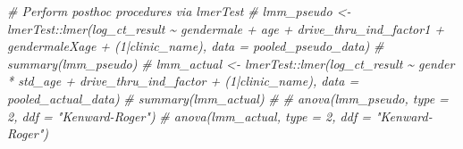 \documentclass[
]{article}
\newenvironment{Shaded}{\begin{snugshade}}{\end{snugshade}}
\newcommand{\CommentTok}[1]{\textcolor[rgb]{0.56,0.35,0.01}{\textit{#1}}}
\begin{document}
\begin{Shaded}
\begin{Highlighting}[]
\CommentTok{\# Perform posthoc procedures via lmerTest}
\CommentTok{\# lmm\_pseudo \textless{}{-} lmerTest::lmer(log\_ct\_result \textasciitilde{} gendermale + age + drive\_thru\_ind\_factor1 + gendermaleXage + (1|clinic\_name), data = pooled\_pseudo\_data)}
\CommentTok{\# summary(lmm\_pseudo)}
\CommentTok{\# lmm\_actual \textless{}{-} lmerTest::lmer(log\_ct\_result \textasciitilde{} gender * std\_age + drive\_thru\_ind\_factor + (1|clinic\_name), data = pooled\_actual\_data)}
\CommentTok{\# summary(lmm\_actual)}
\CommentTok{\# }
\CommentTok{\# anova(lmm\_pseudo, type = 2, ddf = "Kenward{-}Roger")}
\CommentTok{\# anova(lmm\_actual, type = 2, ddf = "Kenward{-}Roger")}
\end{Highlighting}
\end{Shaded}
\end{document}

